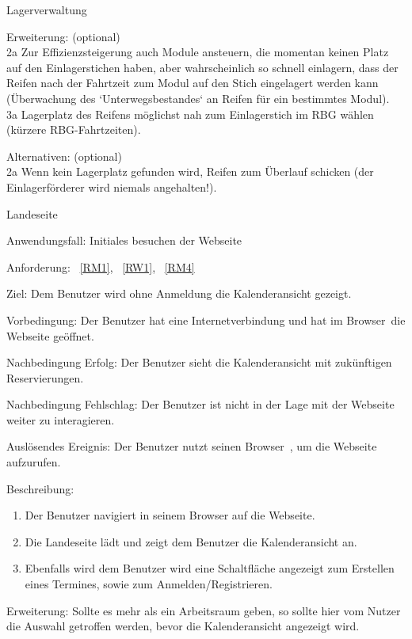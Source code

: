 \begin{function}{10}{Lagerverwaltung}
\begin{enumerate}
    \end{enumerate}
    \item[Erweiterung:] (optional)\\
        2a Zur Effizienzsteigerung auch Module ansteuern, die momentan keinen Platz auf
        den Einlagerstichen haben, aber wahrscheinlich so schnell einlagern, dass der
        Reifen nach der Fahrtzeit zum Modul auf den Stich eingelagert werden kann
        (Überwachung des `Unterwegsbestandes` an Reifen für ein bestimmtes
        Modul).\\
        3a Lagerplatz des Reifens möglichst nah zum Einlagerstich im RBG wählen	(kürzere RBG-Fahrtzeiten).
    \item[Alternativen:] (optional)\\
        2a Wenn kein Lagerplatz gefunden wird, Reifen zum Überlauf schicken (der
        Einlagerförderer wird niemals angehalten!).
\end{function}
\fi

\begin{function}{10}{Landeseite}
    \item[Anwendungsfall:] Initiales besuchen der Webseite
    \item[Anforderung:]~\ref{RM1}, ~\ref{RW1}, ~\ref{RM4}
    \item[Ziel:] Dem Benutzer wird ohne Anmeldung die Kalenderansicht gezeigt.
    \item[Vorbedingung:] Der Benutzer hat eine Internetverbindung und hat im \gls{Browser}~die Webseite geöffnet.
    \item[Nachbedingung Erfolg:] Der Benutzer sieht die Kalenderansicht mit zukünftigen Reservierungen.
    \item[Nachbedingung Fehlschlag:] Der Benutzer ist nicht in der Lage mit der Webseite weiter zu interagieren.
    \item[Auslösendes Ereignis:] Der Benutzer nutzt seinen \gls{Browser}~, um die Webseite aufzurufen.
    \item[Beschreibung:]~
    \begin{enumerate}
        \item Der Benutzer navigiert in seinem Browser auf die Webseite.
        \item Die Landeseite lädt und zeigt dem Benutzer die Kalenderansicht an.
        \item Ebenfalls wird dem Benutzer wird eine Schaltfläche angezeigt zum Erstellen eines Termines, sowie zum Anmelden/Registrieren.
    \end{enumerate}
    \item[Erweiterung:] Sollte es mehr als ein Arbeitsraum geben, so sollte hier vom Nutzer die Auswahl getroffen werden, bevor die Kalenderansicht angezeigt wird.
\end{function}

